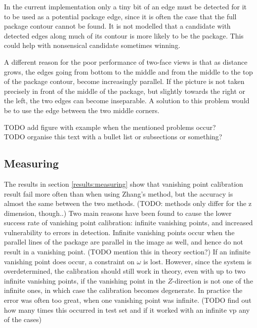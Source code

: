 In the current implementation only a tiny bit of an edge must be detected for it to be used as a potential package edge, since it is often the case that the full package contour cannot be found.
It is not modelled that a candidate with detected edges along much of its contour is more likely to be the package.
This could help with nonsensical candidate sometimes winning.

A different reason for the poor performance of two-face views is that as distance grows, the edges going from bottom to the middle and from the middle to the top of the package contour, become increasingly parallel. %
If the picture is not taken precisely in front of the middle of the package, but slightly towards the right or the left, the two edges can become inseparable.
A solution to this problem would be to use the edge between the two middle corners.

TODO add figure with example when the mentioned problems occur? %
\\TODO organise this text with a bullet list or subsections or something? %

\subsection{Measuring}
The results in section \ref{results:measuring} show that vanishing point calibration result fail more often than when using Zhang's method, but the accuracy is almost the same between the two methods. (TODO: methods only differ for the z dimension, though..) %
Two main reasons have been found to cause the lower success rate of vanishing point calibration: infinite vanishing points, and increased vulnerability to errors in detection.
Infinite vanishing points occur when the parallel lines of the package are parallel in the image as well, and hence do not result in a vanishing point. (TODO mention this in theory section?) %
If an infinite vanishing point does occur, a constraint on $\omega$ is lost.%
However, since the system is overdetermined, the calibration should still work in theory, even with up to two infinite vanishing points, if the vanishing point in the $Z$-direction is not one of the infinite ones, in which case the calibration becomes degenerate.
In practice the error was often too great, when one vanishing point was infinite. (TODO find out how many times this occurred in test set and if it worked with an infinite vp any of the cases) %

